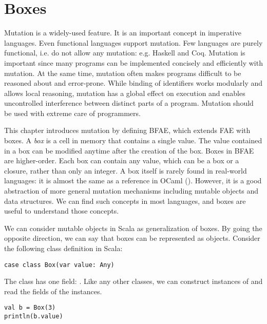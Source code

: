 \setchapterpreamble[u]{\margintoc}
\chapter{Boxes}

\renewcommand{\plang}{\textsf{FAE}\xspace}
\renewcommand{\lang}{\textsf{BFAE}\xspace}

Mutation is a widely-used feature. It is an important concept in imperative
languages. Even functional languages support mutation. Few languages are purely
functional, i.e. do not allow any mutation: e.g. Haskell and Coq. Mutation is
important since many programs can be implemented concisely and efficiently with
mutation. At the same time, mutation often makes programs difficult to be
reasoned about and error-prone. While binding of identifiers works modularly and
allows local reasoning, mutation has a global effect on execution and enables
uncontrolled interference between distinct parts of a program. Mutation should
be used with extreme care of programmers.

This chapter introduces mutation by defining \lang, which extends \plang with
boxes. A \textit{box} is a cell in memory that contains a single value. The value
contained in a box can be modified anytime after the creation of the box.
Boxes in \lang are higher-order. Each box can contain any value, which can be
a box or a closure, rather than only an integer.
A box itself is rarely found in real-world languages: it is almost the same as
a reference in OCaml (). However, it is a good abstraction of more
general mutation mechanisms including mutable objects and data
structures. We can find such concepts in most languages, and boxes are useful to
understand those concepts.

We can consider mutable objects in Scala as generalization of boxes. By
going the opposite direction, we can say that boxes can be represented as
objects. Consider the following class definition in Scala:

\begin{verbatim}
case class Box(var value: Any)
\end{verbatim}

The class  has one field: . Like any other classes, we can
construct instances of  and read the fields of the instances.

\begin{verbatim}
val b = Box(3)
println(b.value)
\end{verbatim}


